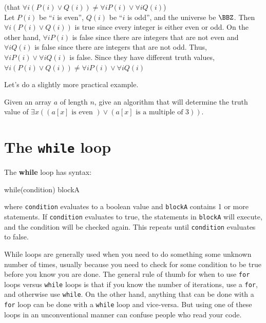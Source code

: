 \begin{exa}
\begin{sol}
\begin{pf} (that  $\forall i(P(i)\vee Q(i)) \neq \forall i P(i) \vee \forall i Q(i)$)\\
Let $P(i)$ be ``$i$ is even'', $Q(i)$ be ``$i$ is odd'', and
the universe be $\BBZ$.  Then  $\forall i(P(i)\vee Q(i))$ is true since every integer is either even or odd.
On the other hand, $\forall i P(i)$ is false since there are integers that are not even 
and $\forall i Q(i)$ is false since there are integers that are not odd.  Thus, 
$\forall i P(i) \vee \forall i Q(i)$ is false.  Since they have different truth values, 
  $\forall i(P(i)\vee Q(i)) \neq \forall i P(i) \vee \forall i Q(i)$
\end{pf}
\end{sol}
\end{exa}

Let's do a slightly more practical example. 

\begin{exer}
Given an array $a$ of length $n$, give an algorithm that will determine the truth value of
$\exists x ( (a[x]\mbox{ is even }) \vee (a[x] \mbox{ is a multiple of 3}) )$.
\vspace*{2in}
\begin{answer}
\end{answer}
\end{exer}

\newpage
\section{The {\tt while} loop}\label{section:while}
\begin{df}
The {\bf while} loop has syntax:
\begin{code}
    while(condition) {
        blockA
    }
\end{code}
where \verb+condition+ evaluates to a boolean value and
\verb+blockA+ contains 1 or more statements.
If \verb+condition+ evaluates to true,
the statements in \verb+blockA+ will execute, 
and the condition will be checked again.
This repeats until \verb+condition+ evaluates to false.
\end{df}

While loops are generally used when you need to do something
some unknown number of times, usually because you need 
to check for some condition to be true before you know you are
done. The general rule of thumb for when to use \verb+for+ loops
versus \verb+while+ loops is that if you know the number of 
iterations, use a \verb+for+, and otherwise use \verb+while+.
On the other hand, anything that can be done with a \verb+for+
loop can be done with a \verb+while+ loop and vice-versa.
But using one of these loops in an unconventional manner can 
confuse people who read your code.

